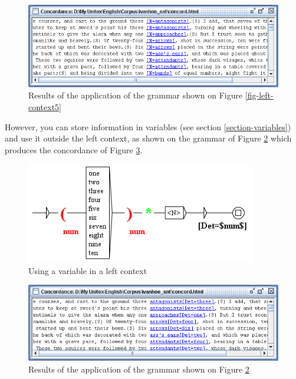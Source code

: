 \begin{figure}[!ht]
\begin{center}
\includegraphics[width=15cm]{resources/img/fig6-17f.png}
\caption{Results of the application of the grammar shown on Figure
\ref{fig-left-context5}\label{fig-left-context6}}
\end{center}
\end{figure}

\bigskip
\noindent However, you can store information in variables (see section
\ref{section-variables}) and use it outside the left context, as shown on the
grammar of Figure \ref{fig-left-context7} which produces the concordance of Figure \ref{fig-left-context8}.

\begin{figure}[!ht]
\begin{center}
\includegraphics[width=10cm]{resources/img/fig6-17g.png}
\caption{Using a variable in a left context\label{fig-left-context7}}
\end{center}
\end{figure}

\begin{figure}[!ht]
\begin{center}
\includegraphics[width=15cm]{resources/img/fig6-17h.png}
\caption{Results of the application of the grammar shown on Figure
\ref{fig-left-context7}\label{fig-left-context8}}
\end{center}
\end{figure}

